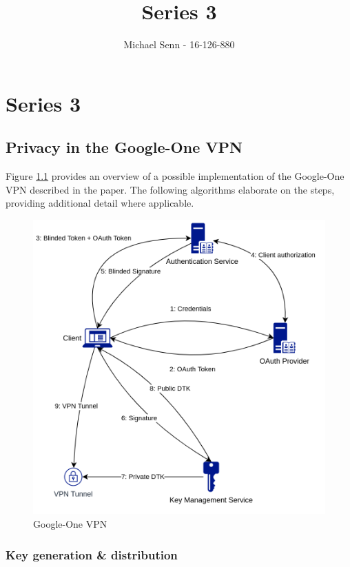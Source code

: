 \documentclass[a4paper]{scrreprt}
\title{Series 3}
\author{Michael Senn \maillink{michael.senn@students.unibe.ch} - 16-126-880}
\date{\printdate}
\begin{document}
\maketitle


\setcounter{chapter}{2}

\chapter{Series 3}

\section{Privacy in the Google-One VPN}

Figure \ref{fig:vpn} provides an overview of a possible implementation of the
Google-One VPN described in the paper. The following algorithms elaborate on
the steps, providing additional detail where applicable.

\begin{figure}[h]
        \centering
		\includegraphics[width=\textwidth]{vpn}
		\caption{Google-One VPN}
		\label{fig:vpn}
\end{figure}

\subsection{Key generation \& distribution}
\end{document}
